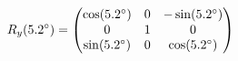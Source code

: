 \documentclass[preview]{standalone}
\begin{document}
\begin{align*}
\special{dvisvgm:raw <g id='unique000'>}R_y(5.2^\circ) = \begin{pmatrix} \cos(5.2^\circ) & 0 & -\sin(5.2^\circ) \\ 0 & 1 & 0 \\ \sin(5.2^\circ) & 0 & \cos(5.2^\circ) \end{pmatrix}\special{dvisvgm:raw </g>}
\end{align*}
\end{document}
